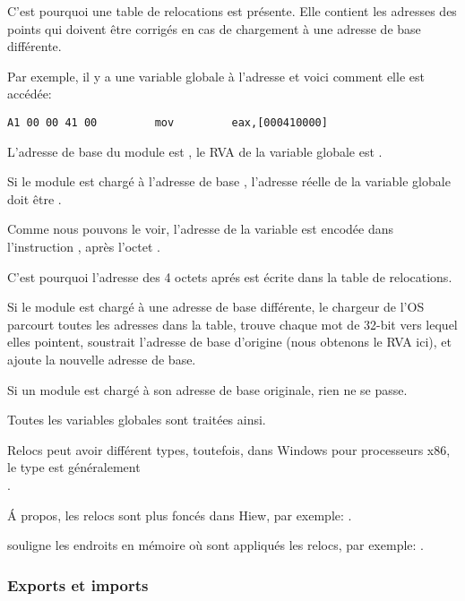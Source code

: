 C'est pourquoi une table de relocations est présente.
Elle contient les adresses des points qui doivent être corrigés en cas de chargement
à une adresse de base différente.

Par exemple, il y a une variable globale à l'adresse  et voici comment
elle est accédée:

\begin{lstlisting}
A1 00 00 41 00         mov         eax,[000410000]
\end{lstlisting}

L'adresse de base du module est , le \ac{RVA} de la variable globale est
.

Si le module est chargé à l'adresse de base , l'adresse réelle de la
variable globale doit être .


Comme nous pouvons le voir, l'adresse de la variable est encodée dans l'instruction
, après l'octet .

C'est pourquoi l'adresse des 4 octets aprés  est écrite dans la table de
relocations.

Si le module est chargé à une adresse de base différente, le chargeur de l'\ac{OS}
parcourt toutes les adresses dans la table, trouve chaque mot de 32-bit vers lequel
elles pointent, soustrait l'adresse de base d'origine (nous obtenons le \ac{RVA} ici),
et ajoute la nouvelle adresse de base.

Si un module est chargé à son adresse de base originale, rien ne se passe.

Toutes les variables globales sont traitées ainsi.

Relocs peut avoir différent types, toutefois, dans Windows pour processeurs x86, le type est généralement \\
.


Á propos, les relocs sont plus foncés dans Hiew, par exemple: .

\myindex{\olly}
\olly souligne les endroits en mémoire où sont appliqués les relocs, par exemple:
.

\subsubsection{Exports et imports}

